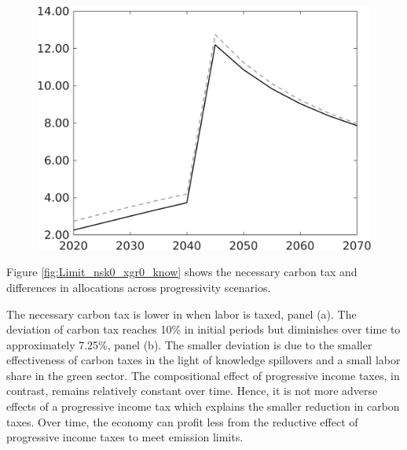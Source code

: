 \begin{figure}[h!!]
\begin{minipage}[]{0.32\textwidth}
\end{minipage}			
\begin{minipage}[]{0.32\textwidth}
\includegraphics[width=1\textwidth]{../../codding_model/own_basedOnFried/optimalPol_010922_revision/figures/all_13Sept22/CompTauf_bytaul_Reg0_gAg_spillover0_nsk0_xgr0_knspil0_sep0_LFlimit1_emsbase0_countec0_GovRev0_etaa0.79_lgd0.png}
\end{minipage}	
 \end{figure} 
 
Figure \ref{fig:Limit_nsk0_xgr0_know} shows the necessary carbon tax and differences in allocations across progressivity scenarios. 

The necessary carbon tax is lower in when labor is taxed, panel (a). The deviation of carbon tax reaches 10\% in initial periods but diminishes over time to approximately 7.25\%, panel (b).
The smaller deviation is due to the smaller effectiveness of carbon taxes in the light of knowledge spillovers and a small labor share in the green sector. The compositional effect of progressive income taxes, in contrast, remains relatively constant over time. Hence, it is not more adverse effects of a progressive income tax which explains the smaller reduction in carbon taxes. Over time, the economy can profit less from the reductive effect of progressive income taxes to meet emission limits. 

